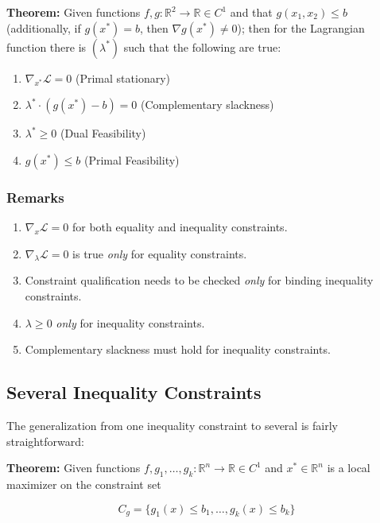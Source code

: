 \documentclass[11pt,]{article}
\providecommand{\tightlist}{%
  \setlength{\itemsep}{0pt}\setlength{\parskip}{0pt}}
\begin{document}
\textbf{Theorem:} Given functions
\(f,g:\mathbb{R}^2\to \mathbb{R}\in C^1\) and that \(g(x_1, x_2)\leq b\)
(additionally, if \(g(x^*)=b\), then \(\nabla g(x^*)\neq 0\)); then for
the Lagrangian function there is \((\lambda^*)\) such that the following
are true:

\begin{enumerate}
\def\labelenumi{\arabic{enumi}.}
\tightlist
\item
  \(\nabla_{x^*} \mathcal{L}=0\) (Primal stationary)
\item
  \(\lambda^*\cdot(g(x^*)-b)=0\) (Complementary slackness)
\item
  \(\lambda^*\geq 0\) (Dual Feasibility)
\item
  \(g(x^*)\leq b\) (Primal Feasibility)
\end{enumerate}

\subsubsection{Remarks}\label{remarks}

\begin{enumerate}
\def\labelenumi{\arabic{enumi}.}
\tightlist
\item
  \(\nabla_{x}\mathcal{L}=0\) for both equality and inequality
  constraints.
\item
  \(\nabla_{\lambda}\mathcal{L}=0\) is true \emph{only} for equality
  constraints.
\item
  Constraint qualification needs to be checked \emph{only} for binding
  inequality constraints.
\item
  \(\lambda\geq 0\) \emph{only} for inequality constraints.
\item
  Complementary slackness must hold for inequality constraints.
\end{enumerate}

\subsection{Several Inequality
Constraints}\label{several-inequality-constraints}

The generalization from one inequality constraint to several is fairly
straightforward:

\textbf{Theorem:} Given functions
\(f, g_1,\hdots,g_k:\mathbb{R}^n\to \mathbb{R}\in C^1\) and
\(x^*\in \mathbb{R}^n\) is a local maximizer on the constraint set

\[C_g=\{g_1(x)\leq b_1,\hdots,g_k(x)\leq b_k\}\]
\end{document}
